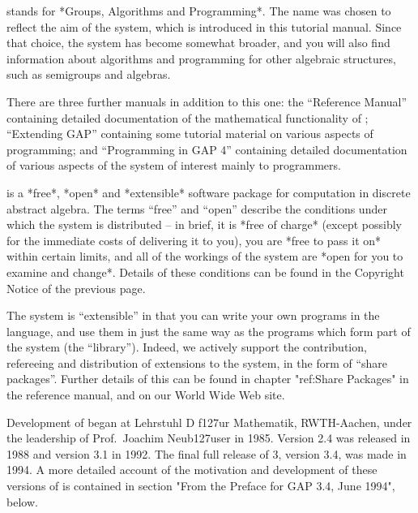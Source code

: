 
{\GAP} stands  for  *Groups, Algorithms  and Programming*.  The  name was
chosen to reflect  the aim of  the  system, which  is introduced in  this
tutorial manual.  Since  that  choice,  the  system has become   somewhat
broader,    and  you will  also   find information   about algorithms and
programming  for other   algebraic structures,   such as semigroups   and
algebras.

There are three further manuals in addition to  this one: the ``Reference
Manual''    containing   detailed  documentation     of  the mathematical
functionality   of {\GAP}; ``Extending   GAP''  containing  some tutorial
material on various aspects  of {\GAP} programming; and  ``Programming in
GAP 4''   containing detailed documentation   of various aspects   of the
system of interest mainly to programmers.

{\GAP}  is  a  *free*, *open*  and    *extensible*  software package  for
computation  in  discrete abstract  algebra.    The terms ``free''  and
``open'' describe the conditions under which the system is distributed --
in brief, it is *free of charge* (except possibly for the immediate costs
of delivering it to  you), you are *free  to pass  it on* within  certain
limits,  and all  of the  workings of  the  system are  *open  for you to
examine and   change*. Details of these conditions can be found
in the Copyright Notice of the previous page.

The system is ``extensible'' in that you can write your own  programs  in
the {\GAP} language, and use them in just the same way  as  the  programs
which form part of the system  (the  ``library'').  Indeed,  we  actively
support the contribution, refereeing and distribution  of  extensions  to
the system, in the form of ``share packages''. Further  details  of  this
can be found in chapter "ref:Share Packages" in the reference manual, and
on our World Wide Web site.

Development of {\GAP} began at Lehrstuhl D f\accent127ur Mathematik, RWTH-Aachen,
under the leadership of Prof.~Joachim Neub\accent127user in 1985. Version 2.4 was
released in 1988 and   version 3.1 in 1992.  The  final full release   of
{\GAP} 3, version 3.4, was  made in 1994. A more  detailed account of the
motivation and development  of these versions  of {\GAP} is contained  in
section "From the Preface for GAP 3.4, June 1994", below.

